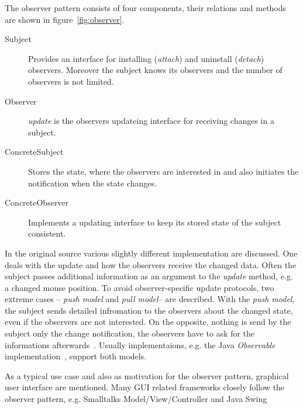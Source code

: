 \documentclass[acmsmall]{acmart}\settopmatter{printfolios=true,printccs=false,printacmref=false}
\begin{document}
	The observer pattern consists of four components, their relations and methods are shown in figure~\ref{fig:observer}.

	\begin{description}
		\item[Subject] Provides an interface for installing (\textit{attach}) and uninstall (\textit{detach}) observers. 
		Moreover the subject knows its observers and the number of observers is not limited.
		\item[Observer] \textit{update} is the observers updateing interface for receiving changes in a subject.
		\item[ConcreteSubject] Stores the state, where the observers are interested in and also initiates the notification when the state changes.
		\item[ConcreteObserver] Implements a updating interface to keep its stored state of the subject consistent. 
	\end{description}

	In the original source various slightly different implementation are discussed. 
	One deals with the update and how the observers receive the changed data. 
	Often the subject passes additional information as an argument to the \textit{update} method, e.g. a changed mouse position. 
	To avoid observer-specific update protocols, two extreme cases -- \textit{push model} and \textit{pull model}-- are described.
	With the \textit{push model}, the subject sends detailed infromation to the observers about the changed state, even if the observers are not interested. 
	On the opposite, nothing is send by the subject only the change notification, the observers have to ask for the informations afterwards~\cite{Gamma:1995}.
	Usually implementaions, e.g. the Java \textit{Observable} implementation~\cite{oracleObservable}, support both models.

	As a typical use case and also as motivation for the observer pattern, graphical user interface are mentioned.
	Many GUI related frameworks closely follow the observer pattern, e.g. Smalltalks Model/View/Controller and Java Swing~\cite{Gamma:1995,Maier:2012}
\end{document}
